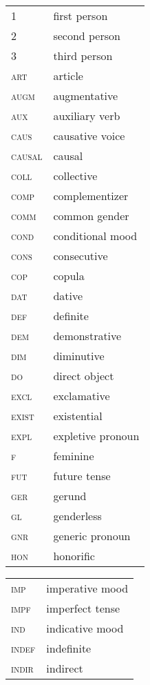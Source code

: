 \begin{refsection}

\begin{tabularx}{.45\textwidth}{ll} 
1& first person\\
2 & second person\\
3 & third person\\
\textsc{art} & article\\
\textsc{augm} & augmentative\\
\textsc{aux} & auxiliary verb\\
\textsc{caus} & causative voice\\
\textsc{causal} & causal\\
\textsc{coll} & collective\\
\textsc{comp} & complementizer\\
\textsc{comm} & common gender\\
\textsc{cond} & conditional mood\\
\textsc{cons} & consecutive\\
\textsc{cop} & copula\\
\textsc{dat} & dative\\
\textsc{def} & definite\\
\textsc{dem} & demonstrative\\
\textsc{dim} & diminutive\\
\textsc{do} & direct object\\
\textsc{excl} & exclamative\\
\textsc{exist} & existential\\
\textsc{expl} & expletive pronoun\\
\textsc{f} & feminine\\
\textsc{fut} & future tense\\
\textsc{ger} & gerund\\
\textsc{gl} & genderless\\
\textsc{gnr} & generic pronoun\\
\textsc{hon} & honorific\\
\end{tabularx}
\begin{tabularx}{.45\textwidth}{ll} 
\textsc{imp} & imperative mood\\
\textsc{impf} & imperfect tense\\
\textsc{ind} & indicative mood\\
\textsc{indef} & indefinite\\
\textsc{indir} & indirect\\

\end{tabularx}
\end{refsection}
